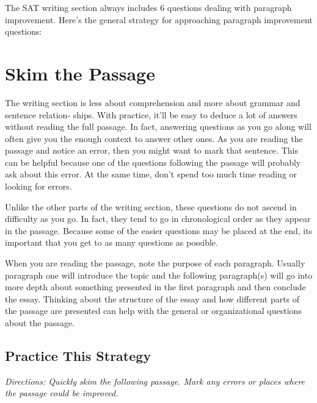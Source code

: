 The SAT writing section always includes 6 questions dealing with paragraph improvement. Here's
the general strategy for approaching paragraph improvement questions:

\section{Skim the Passage}
The writing section is less about comprehension and more about grammar and sentence relation-
ships. With practice, it'll be easy to deduce a lot of answers without reading the full passage. In
fact, answering questions as you go along will often give you the enough context to answer other
ones. As you are reading the passage and notice an error, then you might want to mark that sentence. This can be helpful because one of the questions following the passage will probably ask about this error. At the same time, don't spend too much time reading or looking for errors.

\bigskip
Unlike the other parts of the writing section, these questions do not ascend in difficulty as you go. In fact, they tend to go in chronological order as they appear in the passage. Because some of the easier questions may be placed at the end, its important that you get to as many questions as possible.

When you are reading the passage, note the purpose of each paragraph. Usually paragraph one will introduce the topic and the following paragraph(s) will go into more depth about something presented in the first paragraph and then conclude the essay. Thinking about the structure of the essay and how different parts of the passage are presented can help with the general or organizational questions about the passage.

\subsection{Practice This Strategy}
\textit{Directions: Quickly skim the following passage. Mark any errors or places where the passage could be improved.}

